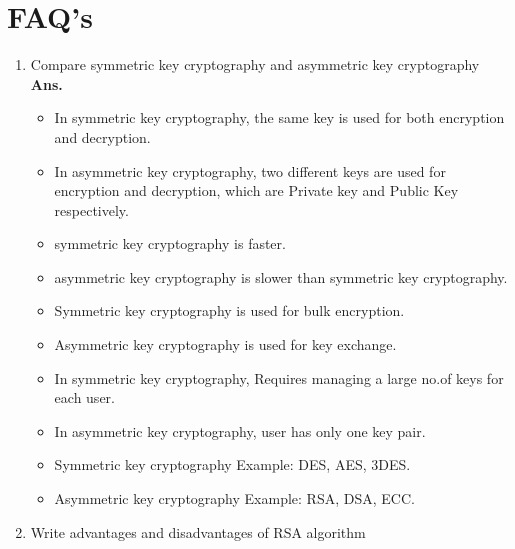 \documentclass{article}
\begin{document}
\section{\textbf{FAQ's}}
\begin{enumerate}
	\item Compare symmetric key cryptography and asymmetric key cryptography\\
	
	\textbf{Ans.} 
	\begin{itemize}
		\item In symmetric key cryptography, the same key is used for both encryption and decryption.
		\item In asymmetric key cryptography, two different keys are used for encryption and decryption, which are Private key and Public Key respectively.
		\item symmetric key cryptography is faster.
		\item asymmetric key cryptography is slower than symmetric key cryptography.
		\item Symmetric key cryptography is used for bulk encryption.
		\item Asymmetric key cryptography is used for key exchange.
		\item In symmetric key cryptography, Requires managing a large no.of keys for each user.
		\item In asymmetric key cryptography, user has only one key pair.
		\item Symmetric key cryptography Example: DES, AES, 3DES.
		\item Asymmetric key cryptography Example: RSA, DSA, ECC.
	\end{itemize}
	\item Write advantages and disadvantages of RSA algorithm\\
	

\end{enumerate}
\end{document}
